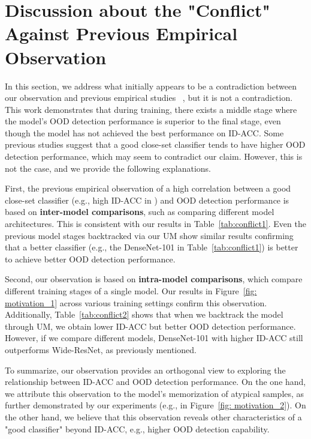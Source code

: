 \documentclass{article}
\theoremstyle{plain}
\theoremstyle{definition}
\theoremstyle{remark}
\begin{document}
\section{Discussion about the "Conflict" Against Previous Empirical Observation}
\label{app:conflict}

In this section, we address what initially appears to be a contradiction between our observation and previous empirical studies~ \citep{vaze2022openset,fort2021exploring}, but it is not a contradiction. This work demonstrates that during training, there exists a middle stage where the model's OOD detection performance is superior to the final stage, even though the model has not achieved the best performance on ID-ACC. Some previous studies \citep{vaze2022openset,fort2021exploring} suggest that a good close-set classifier tends to have higher OOD detection performance, which may seem to contradict our claim. However, this is not the case, and we provide the following explanations.

First, the previous empirical observation \citep{vaze2022openset,fort2021exploring} of a high correlation between a good close-set classifier (e.g., high ID-ACC in \citep{vaze2022openset}) and OOD detection performance is based on \textbf{inter-model comparisons}, such as comparing different model architectures. This is consistent with our results in Table~\ref{tab:conflict1}. Even the previous model stages backtracked via our UM show similar results confirming that a better classifier (e.g., the DenseNet-101 in Table~\ref{tab:conflict1}) is better to achieve better OOD detection performance.

Second, our observation is based on \textbf{intra-model comparisons}, which compare different training stages of a single model. Our results in Figure~\ref{fig: motivation_1} across various training settings confirm this observation. Additionally, Table~\ref{tab:conflict2} shows that when we backtrack the model through UM, we obtain lower ID-ACC but better OOD detection performance. However, if we compare different models, DenseNet-101 with higher ID-ACC still outperforms Wide-ResNet, as previously mentioned.

To summarize, our observation provides an orthogonal view to exploring the relationship between ID-ACC and OOD detection performance. On the one hand, we attribute this observation to the model's memorization of atypical samples, as further demonstrated by our experiments (e.g., in Figure~\ref{fig: motivation_2}). On the other hand, we believe that this observation reveals other characteristics of a "good classifier" beyond ID-ACC, e.g., higher OOD detection capability.
\end{document}

